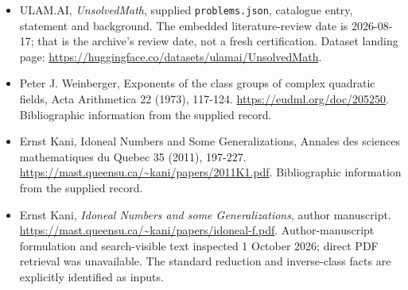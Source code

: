 \documentclass[11pt,a4paper]{article}
\begin{document}
{\small

\begin{itemize}

\item[\hypertarget{source:statement:1}{S1}] ULAM.AI, \emph{UnsolvedMath}, supplied \texttt{problems.json}, catalogue entry, statement and background. The embedded literature-review date is 2026-08-17; that is the archive’s review date, not a fresh certification. Dataset landing page: \url{https://huggingface.co/datasets/ulamai/UnsolvedMath}.

\item[\hypertarget{source:statement:2}{S2}] Peter J. Weinberger, Exponents of the class groups of complex quadratic fields, Acta Arithmetica 22 (1973), 117-124. \url{https://eudml.org/doc/205250}. Bibliographic information from the supplied record.

\item[\hypertarget{source:statement:3}{S3}] Ernst Kani, Idoneal Numbers and Some Generalizations, Annales des sciences mathematiques du Quebec 35 (2011), 197-227. \url{https://mast.queensu.ca/~kani/papers/2011K1.pdf}. Bibliographic information from the supplied record.


\item[E1] Ernst Kani, \emph{Idoneal Numbers and some Generalizations},
author manuscript. \url{https://mast.queensu.ca/~kani/papers/idoneal-f.pdf}.
Author-manuscript formulation and search-visible text inspected
1 October 2026; direct PDF retrieval was unavailable. The standard
reduction and inverse-class facts are explicitly identified as inputs.

\end{itemize}

}

\label{end:statement}
\end{document}

